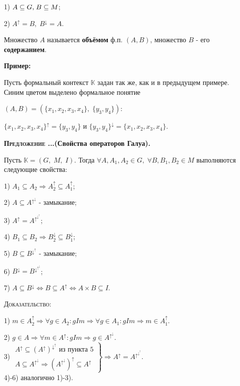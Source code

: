 \documentclass[18pt, a4paper]{extarticle}
\newcounter{par}
\newcounter{spar}
\newcounter{zap}
\newcommand{\predlT}[1]{\textbf{\textsc{Предложение \thepar.\if\thespar1\thespar.\fi\thezap.}(#1).}\stepcounter{zap}}
\newcommand{\primer}{\textbf{Пример:\;}}
\newcommand{\dok}{\textsc{Доказательство:}}
\newcommand{\galoisup}{^\uparrow}
\newcommand{\galoisdown}{^\downarrow}
\begin{document}
1) $A\subseteq G\text,\;B\subseteq M$;

2) $A\galoisup=B,\;B\galoisdown=A$.

Множество $A$ называется \textbf{объёмом} ф.п. $(A,B)$, множество $B$ - его \textbf{содержанием}.

\primer

Пусть формальный контекст $\mathbb{K}$ задан так же, как и в предыдущем примере. Синим цветом выделено формальное понятие

$(A,B)=(\{x_1,x_2,x_3,x_4\},\;\{y_3,y_4\})$:

$\{x_1,x_2,x_3,x_4\}\galoisup=\{y_3,y_4\}\text{ и }\{y_3,y_4\}\galoisdown=\{x_1,x_2,x_3,x_4\}$.\newpage

\predlT{Свойства операторов Галуа}

Пусть $\mathbb{K}=(G,\;M,\;I)$. Тогда $\forall A,A_1,A_2\in G,\;\forall B,B_1,B_2\in M$ выполняются следующие свойства:

1) $A_1\subseteq A_2\Rightarrow A_2\galoisup\subseteq A_1\galoisup$;

2) $A\subseteq A\galoisup\galoisdown$ - замыкание;

3) $A\galoisup=A\galoisup\galoisdown\galoisup$;

4) $B_1\subseteq B_2\Rightarrow B_2\galoisdown\subseteq B_1\galoisdown$;

5) $B\subseteq B\galoisdown\galoisup$ - замыкание;

6) $B\galoisdown=B\galoisdown\galoisup\galoisdown$;

7) $A\subseteq B\galoisdown\Leftrightarrow B\subseteq A\galoisup\Leftrightarrow A\times B\subseteq I$.

\dok

1) $m\in A_2\galoisup\Rightarrow\forall g\in A_2:gIm\Rightarrow\forall g\in A_1:gIm\Rightarrow m\in A_1\galoisup$.

2) $g\in A\Rightarrow\forall m\in A\galoisup:gIm\Rightarrow g\in A\galoisup\galoisdown$.\\

3) $\left.
  \begin{array}{c}
    A\galoisup\subseteq (A\galoisup)\galoisdown\galoisup\text{ из пункта 5} \\
    A\subseteq A\galoisup\galoisdown\Rightarrow (A\galoisup\galoisdown)\galoisup\subseteq A\galoisup
  \end{array}
  \right\}\Rightarrow A\galoisup=A\galoisup\galoisdown\galoisup$.\\

4)-6) аналогично 1)-3).
\end{document}

